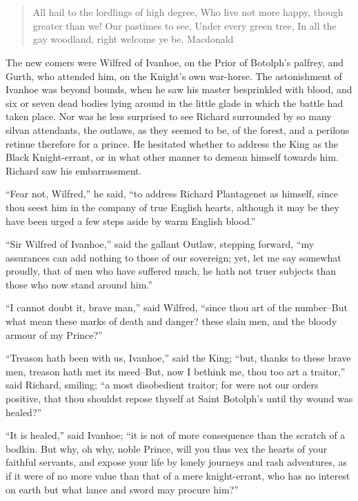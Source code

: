 \chapter{}

\begin{quote}
All hail to the lordlings of high degree,
Who live not more happy, though greater than we!
Our pastimes to see,
Under every green tree,
In all the gay woodland, right welcome ye be.
Macdonald
\end{quote}

The new comers were Wilfred of Ivanhoe, on the Prior of Botolph's
palfrey, and Gurth, who attended him, on the Knight's own war-horse. The
astonishment of Ivanhoe was beyond bounds, when he saw his master
besprinkled with blood, and six or seven dead bodies lying around in the
little glade in which the battle had taken place. Nor was he less
surprised to see Richard surrounded by so many silvan attendants, the
outlaws, as they seemed to be, of the forest, and a perilous retinue
therefore for a prince. He hesitated whether to address the King as the
Black Knight-errant, or in what other manner to demean himself towards
him. Richard saw his embarrassment.

``Fear not, Wilfred,'' he said, ``to address Richard Plantagenet as
himself, since thou seest him in the company of true English hearts,
although it may be they have been urged a few steps aside by warm
English blood.''

``Sir Wilfred of Ivanhoe,'' said the gallant Outlaw, stepping forward,
``my assurances can add nothing to those of our sovereign; yet, let me
say somewhat proudly, that of men who have suffered much, he hath not
truer subjects than those who now stand around him.''

``I cannot doubt it, brave man,'' said Wilfred, ``since thou art of the
number--But what mean these marks of death and danger? these slain men,
and the bloody armour of my Prince?''

``Treason hath been with us, Ivanhoe,'' said the King; ``but, thanks to
these brave men, treason hath met its meed--But, now I bethink me, thou
too art a traitor,'' said Richard, smiling; ``a most disobedient
traitor; for were not our orders positive, that thou shouldst repose
thyself at Saint Botolph's until thy wound was healed?''

``It is healed,'' said Ivanhoe; ``it is not of more consequence than the
scratch of a bodkin. But why, oh why, noble Prince, will you thus vex
the hearts of your faithful servants, and expose your life by lonely
journeys and rash adventures, as if it were of no more value than that
of a mere knight-errant, who has no interest on earth but what lance and
sword may procure him?''


